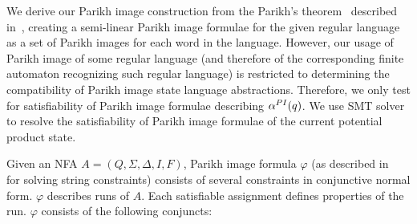 We derive our Parikh image construction from the Parikh's theorem~\cite{Kozen1977} described in~\cite{ParikhsTheoremSimpleAndDirectConstruction}, creating a semi-linear Parikh image formulae for the given regular language as a set of Parikh images for each word in the language. However, our usage of Parikh image of some regular language (and therefore of the corresponding finite automaton recognizing such regular language) is restricted to determining the compatibility of Parikh image state language abstractions. Therefore, we only test for satisfiability of Parikh image formulae describing $\alpha^{PI}(q)$. We use SMT solver to resolve the satisfiability of Parikh image formulae of the current potential product state.

Given an NFA $A = (Q, \Sigma, \Delta, I, F)$, Parikh image formula $\varphi$ (as described in~\cite{PI_computation/10.1007/978-3-030-45093-9_59} for solving string constraints) consists of several constraints in conjunctive normal form. $\varphi$ describes runs of $A$. Each satisfiable assignment defines properties of the run. $\varphi$ consists of the following conjuncts:

